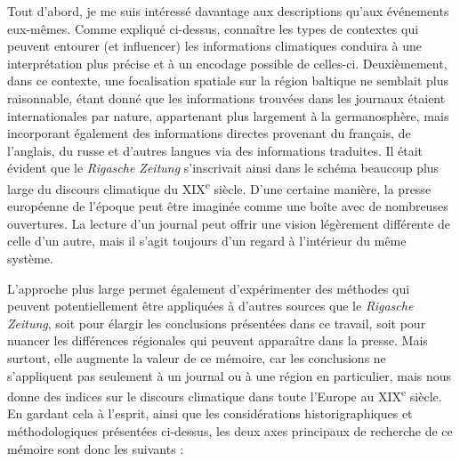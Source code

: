 \documentclass[a4paper,twoside,12pt]{article}
\begin{document}
Tout d'abord, je me suis intéressé davantage aux descriptions qu'aux événements eux-mêmes. Comme expliqué ci-dessus, connaître les types de contextes qui peuvent entourer (et influencer) les informations climatiques conduira à une interprétation plus précise et à un encodage possible de celles-ci. Deuxièmement, dans ce contexte, une focalisation spatiale sur la région baltique ne semblait plus raisonnable, étant donné que les informations trouvées dans les journaux étaient internationales par nature, appartenant plus largement à la germanosphère, mais incorporant également des informations directes provenant du français, de l'anglais, du russe et d'autres langues via des informations traduites. Il était évident que le \textit{Rigasche Zeitung} s'inscrivait ainsi dans le schéma beaucoup plus large du \og discours climatique \fg{} du XIX\textsuperscript{e} siècle. D'une certaine manière, la presse européenne de l'époque peut être imaginée comme une boîte avec de nombreuses ouvertures. La lecture d'un journal peut offrir une vision légèrement différente de celle d'un autre, mais il s'agit toujours d'un regard à l'intérieur du même système.

L'approche plus large permet également d'expérimenter des méthodes qui peuvent potentiellement être appliquées à d'autres sources que le \textit{Rigasche Zeitung}, soit pour élargir les conclusions présentées dans ce travail, soit pour nuancer les différences régionales qui peuvent apparaître dans la presse. Mais surtout, elle augmente la valeur de ce mémoire, car les conclusions ne s'appliquent pas seulement à un journal ou à une région en particulier, mais nous donne des indices sur le discours climatique dans toute l'Europe au XIX\textsuperscript{e} siècle. En gardant cela à l'esprit, ainsi que les considérations historigraphiques et méthodologiques présentées ci-dessus, les deux axes principaux de recherche de ce mémoire sont donc les suivants :
\end{document}
